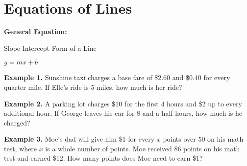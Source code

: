 \section{Equations of Lines}

\bigskip
\textbf{General Equation:}

\begin{center}
Slope-Intercept Form of a Line

$y=mx+b$
\end{center}

\vfill
\textbf{Example 1.} Sunshine taxi charges a base fare of \$2.60 and \$0.40 for every quarter mile. If Elle's ride is 5 miles, how much is her ride?

\vfill
\textbf{Example 2.} A parking lot charges \$10 for the first 4 hours and \$2 up to every additional hour. If George leaves his car for 8 and a half hours, how much is he charged?

\vfill
\textbf{Example 3.} Moe's dad will give him \$1 for every $x$ points over 50 on his math test, where $x$ is a whole number of points. Moe received 86 points on his math test and earned \$12. How many points does Moe need to earn \$1?

